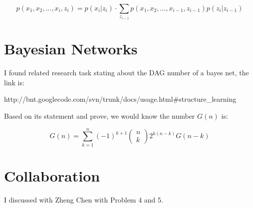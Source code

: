 \documentclass{article} %
\begin{document}
\begin{equation}
p (x_1, x_2, ..., x_i, z_i) = p (x_i | z_i) \cdot
\sum_{z_{i-1}}p (x_1, x_2, ..., x_{i-1}, z_{i-1}) p (z_i | z_{i-1})
\end{equation}



\section{Bayesian Networks}
I found related research task stating about the DAG number of a bayes net, the
link is:

http://bnt.googlecode.com/svn/trunk/docs/usage.html\#structure\_learning

Based on its statement and prove, we would know the number $G (n)$ is:

\begin{equation}
G (n) = \sum_{k=1}^n (-1)^{k+1}
\left (
    \begin{array}{c}
        n \\
        k
    \end{array}
\right )
2^{k (n-k)} G (n-k)
\end{equation}


\section{Collaboration}
I discussed with Zheng Chen with Problem 4 and 5.
\end{document}
